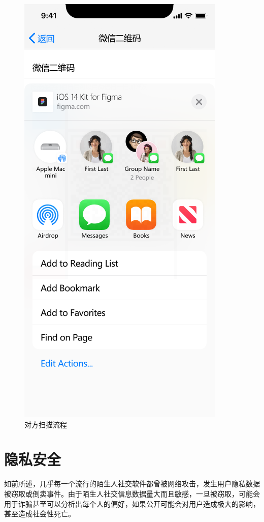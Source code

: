 \documentclass[UTF8]{ctexart}
\begin{document}
\begin{figure}[htbp]
{\begin{minipage}[b]{.3\linewidth}
            \centering
            \includegraphics[scale=0.3]{ShareWechat.png}
        \end{minipage}
    }
    \caption{对方扫描流程}
    \label{ScanProcedure}
\end{figure}

\section{隐私安全}

如前所述，几乎每一个流行的陌生人社交软件都曾被网络攻击，发生用户隐私数据被窃取或倒卖事件。由于陌生人社交信息数据量大而且敏感，一旦被窃取，可能会用于诈骗甚至可以分析出每个人的偏好，如果公开可能会对用户造成极大的影响，甚至造成社会性死亡。
\end{document}
